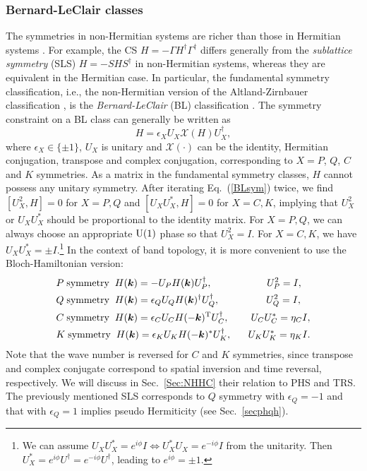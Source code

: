 \documentclass{tADP2e}
\theoremstyle{plain}
\theoremstyle{plain}
\theoremstyle{definition}
\begin{document}
\subsubsection{Bernard-LeClair classes}\label{Sec:5BL}
The symmetries in non-Hermitian systems are richer than those in Hermitian systems \cite{DB02,EK11,SM12,RJDH19}. For example, the CS $H=-\Gamma H^\dag \Gamma^\dag$ differs generally from the \emph{sublattice symmetry} (SLS) $H=-S H S^\dag$ in non-Hermitian systems, whereas  they are equivalent in the Hermitian case. In particular, the fundamental symmetry classification, i.e., the non-Hermitian version of the Altland-Zirnbauer classification \cite{AA97}, is the \emph{Bernard-LeClair} (BL) classification  \cite{DB01}. The symmetry constraint on a BL class can generally be written as
\begin{equation}
H=\epsilon_X U_X\mathcal{X}(H)U^\dag_X,
\label{BLsym}
\end{equation}
where $\epsilon_X\in\{\pm1\}$, $U_X$ is unitary and $\mathcal{X}(\cdot)$ can be the identity, Hermitian conjugation, transpose and complex conjugation, corresponding to $X=P$, $Q$, $C$ and $K$ symmetries. As a matrix in the fundamental symmetry classes, $H$ cannot possess any unitary symmetry. After iterating Eq.~(\ref{BLsym}) twice, we find $[U_X^2,H]=0$ for $X=P,Q$ and $[U_XU_X^*,H]=0$ for $X=C,K$, implying that $U_X^2$ or $U_XU_X^*$ should be proportional to the identity matrix. For $X=P,Q$, we can always choose an appropriate  ${\rm U}(1)$ phase so that $U_X^2=I$. For $X=C,K$, we have $U_XU_X^*=\pm I$.\footnote{We can assume $U_XU_X^*=e^{i\phi}I\Leftrightarrow U_X^*U_X=e^{-i\phi}I$ from the unitarity. Then $U_X^*=e^{i\phi}U^\dag=e^{-i\phi}U^\dag$, leading to $e^{i\phi}=\pm1$.} In the context of band topology, it is more convenient to use the Bloch-Hamiltonian version: %
\begin{equation}
\begin{split}
&P\;{\rm symmetry}\;\;H(\boldsymbol{k})=-U_PH(\boldsymbol{k}) U_P^\dag,\;\;\;\;\;\;\;\;\;\;\;\;\;\;\;\;\;\;\;\;U^2_P=I, \\
&Q\;{\rm symmetry}\;\;H(\boldsymbol{k})=\epsilon_QU_QH(\boldsymbol{k})^\dag U_Q^\dag,\;\;\;\;\;\;\;\;\;\;\;\;\;\;\;\;\;U^2_Q=I, \\
&C\;{\rm symmetry}\;\;H(\boldsymbol{k})=\epsilon_CU_CH(-\boldsymbol{k})^{\rm T} U_C^\dag,\;\;\;\;\;\;\;\;U_CU_C^*=\eta_CI, \\
&K\;{\rm symmetry}\;\;H(\boldsymbol{k})=\epsilon_KU_KH(-\boldsymbol{k})^*U_K^\dag,\;\;\;\;\;\;U_KU_K^*=\eta_KI. 
\end{split}
\label{PQCK}
\end{equation}
Note that the wave number is reversed for $C$ and $K$ symmetries, since transpose and complex conjugate correspond to spatial inversion and time reversal, respectively. We will discuss in Sec.~\ref{Sec:NHHC} their relation to PHS and TRS. 
The previously mentioned SLS corresponds to $Q$ symmetry with $\epsilon_Q=-1$ and that with $\epsilon_Q=1$ implies pseudo Hermiticity (see Sec.~\ref{secphqh}).
\end{document}
